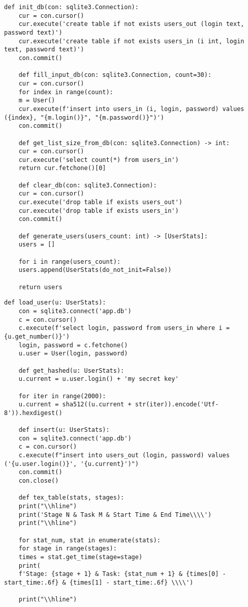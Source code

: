 \documentclass[../report.tex]{subfiles}
\begin{document}
\newpage
\begin{lstlisting}[caption=Файл master.py (часть 1)]
	def init_db(con: sqlite3.Connection):
	cur = con.cursor()
	cur.execute('create table if not exists users_out (login text, password text)')
	cur.execute('create table if not exists users_in (i int, login text, password text)')
	con.commit()
	
	def fill_input_db(con: sqlite3.Connection, count=30):
	cur = con.cursor()
	for index in range(count):
	m = User()
	cur.execute(f'insert into users_in (i, login, password) values ({index}, "{m.login()}", "{m.password()}")')
	con.commit()
	
	def get_list_size_from_db(con: sqlite3.Connection) -> int:
	cur = con.cursor()
	cur.execute('select count(*) from users_in')
	return cur.fetchone()[0]
	
	def clear_db(con: sqlite3.Connection):
	cur = con.cursor()
	cur.execute('drop table if exists users_out')
	cur.execute('drop table if exists users_in')
	con.commit()
	
	def generate_users(users_count: int) -> [UserStats]:
	users = []
	
	for i in range(users_count):
	users.append(UserStats(do_not_init=False))
	
	return users
\end{lstlisting}

\newpage
\begin{lstlisting}[caption=Файл master.py (часть 2)]
	def load_user(u: UserStats):
	con = sqlite3.connect('app.db')
	c = con.cursor()
	c.execute(f'select login, password from users_in where i = {u.get_number()}')
	login, password = c.fetchone()
	u.user = User(login, password)
	
	def get_hashed(u: UserStats):
	u.current = u.user.login() + 'my secret key'
	
	for iter in range(2000):
	u.current = sha512((u.current + str(iter)).encode('Utf-8')).hexdigest()
	
	def insert(u: UserStats):
	con = sqlite3.connect('app.db')
	c = con.cursor()
	c.execute(f"insert into users_out (login, password) values ('{u.user.login()}', '{u.current}')")
	con.commit()
	con.close()
	
	def tex_table(stats, stages):
	print("\\hline")
	print('Stage N & Task M & Start Time & End Time\\\\')
	print("\\hline")
	
	for stat_num, stat in enumerate(stats):
	for stage in range(stages):
	times = stat.get_time(stage=stage)
	print(
	f'Stage: {stage + 1} & Task: {stat_num + 1} & {times[0] - start_time:.6f} & {times[1] - start_time:.6f} \\\\')
	
	print("\\hline")
\end{lstlisting}
\end{document}
